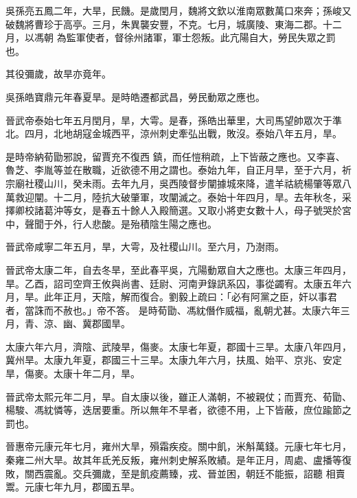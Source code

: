 \begin{pinyinscope}
 吳孫亮五鳳二年，大旱，民饑。是歲閏月，魏將文欽以淮南眾數萬口來奔；孫峻又破魏將曹珍于高亭。三月，朱異襲安豐，不克。七月，城廣陵、東海二郡。十二月，以馮朝
 為監軍使者，督徐州諸軍，軍士怨叛。此亢陽自大，勞民失眾之罰也。



 其役彌歲，故旱亦竟年。



 吳孫皓寶鼎元年春夏旱。是時皓遷都武昌，勞民動眾之應也。



 晉武帝泰始七年五月閏月，旱，大雩。是春，孫皓出華里，大司馬望帥眾次于準北。四月，北地胡寇金城西平，涼州刺史牽弘出戰，敗沒。泰始八年五月，旱。



 是時帝納荀勖邪說，留賈充不復西
 鎮，而任愷稍疏，上下皆蔽之應也。又李喜、魯芝、李胤等並在散職，近欲德不用之謂也。泰始九年，自正月旱，至于六月，祈宗廟社稷山川，癸未雨。去年九月，吳西陵督步闡據城來降，遣羊祜統楊肇等眾八萬救迎闡。十二月，陸抗大破肇軍，攻闡滅之。泰始十年四月，旱。去年秋冬，采擇卿校諸葛沖等女，是春五十餘人入殿簡選。又取小將吏女數十人，母子號哭於宮中，聲聞于外，行人悲酸。是殆積陰生陽之應也。



 晉武帝咸寧二年五月，旱，大雩，及社稷山川。至六月，乃澍雨。



 晉武帝太康二年，自去冬旱，至此春平吳，亢陽動眾自大之應也。太康三年四月，旱。乙酉，詔司空齊王攸與尚書、廷尉、河南尹錄訊系囚，事從蠲宥。太康五年六月，旱。此年正月，天陰，解而復合。劉毅上疏曰：「必有阿黨之臣，奸以事君者，當誅而不赦也。」帝不答。
 是時荀勖、馮紞僭作威福，亂朝尤甚。太康六年三月，青、涼、幽、冀郡國旱。



 太康六年六月，濟陰、武陵旱，傷麥。太康七年夏，郡國十三旱。太康八年四月，冀州旱。太康九年夏，郡國三十三旱。太康九年六月，扶風、始平、京兆、安定旱，傷麥。太康十年二月，旱。



 晉武帝太熙元年二月，旱。自太康以後，雖正人滿朝，不被親仗；而賈充、荀勖、楊駿、馮紞憐等，迭居要重。所以無年不旱者，欲德不用，上下皆蔽，庶位踰節之罰也。



 晉惠帝元康元年七月，雍州大旱，殞霜疾疫。關中飢，米斛萬錢。元康七年七月，秦雍二州大旱。故其年氐羌反叛，雍州刺史解系敗績。是年正月，周處、盧播等復敗，關西震亂。交兵彌歲，至是飢疫薦臻，戎、晉並困，朝廷不能振，詔聽
 相賣鬻。元康七年九月，郡國五旱。




\end{pinyinscope}

